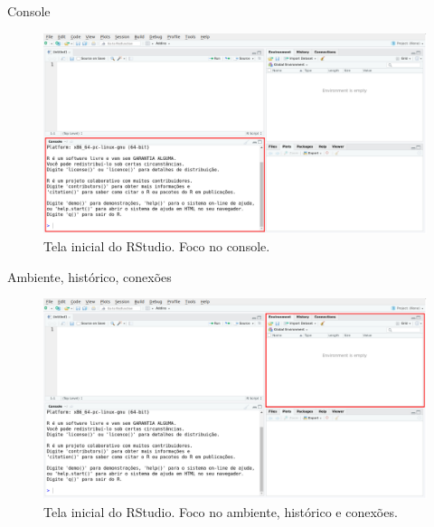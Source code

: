 \documentclass[
  ignorenonframetext,
  serif,
  professionalfont,
  usenames,
  dvipsnames,
  aspectratio = 169]{beamer}
\begin{document}
\begin{frame}{Console}
\label{console}
\begin{figure}

{\centering \includegraphics[width=0.85\linewidth]{./img/console} 

}

\caption{Tela inicial do RStudio. Foco no console.}\label{fig:unnamed-chunk-13}
\end{figure}
\end{frame}

\begin{frame}{Ambiente, histórico, conexões}
\label{ambiente-histuxf3rico-conexuxf5es}
\begin{figure}

{\centering \includegraphics[width=0.85\linewidth]{./img/env} 

}

\caption{Tela inicial do RStudio. Foco no ambiente, histórico e conexões.}\label{fig:unnamed-chunk-14}
\end{figure}
\end{frame}
\end{document}
